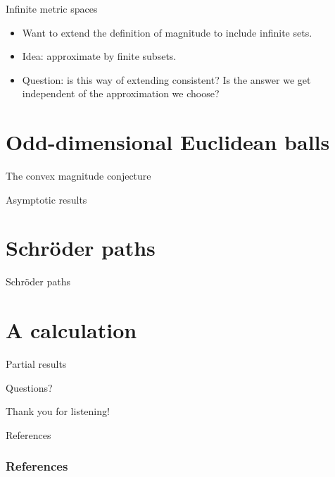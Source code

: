 \documentclass[12pt,mathserif]{beamer}
\begin{document}
\begin{frame}[allowframebreaks]{Infinite metric spaces}
\begin{itemize}
\item Want to extend the definition of magnitude to include infinite sets.
\item Idea: approximate by finite subsets.
\item Question: is this way of extending consistent? Is the answer we get independent of the approximation we choose?
\end{itemize}
\end{frame}

\section{Odd-dimensional Euclidean balls}

\begin{frame}[allowframebreaks]{The convex magnitude conjecture}
\end{frame}
\begin{frame}[allowframebreaks]{Asymptotic results}
\end{frame}

\section{Schröder paths}

\begin{frame}[allowframebreaks]{Schröder paths}
\end{frame}

\section{A calculation}

\begin{frame}[allowframebreaks]{Partial results}
\end{frame}

\begin{frame}[plain]
\centerline{Questions?}
\end{frame}

\begin{frame}[plain]
\centerline{Thank you for listening!}
\end{frame}

\begin{frame}[allowframebreaks]{References}
\frametitle{References}
\nocite{*}


\end{frame}
\end{document}
